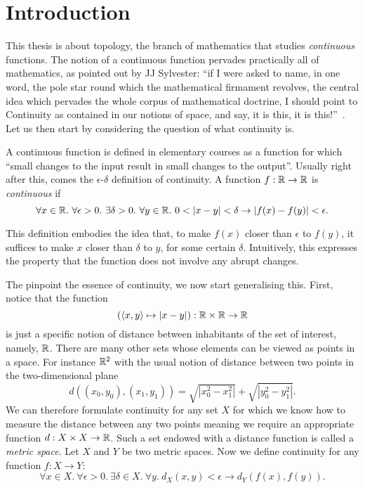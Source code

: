 \chapter{Introduction}

This thesis is about topology, the branch of mathematics that studies \emph{continuous}
functions. The notion of a continuous function pervades practically all of mathematics, as
pointed out by JJ Sylvester: ``if I were asked to name, in one word, the pole star round
which the mathematical firmament revolves, the central idea which pervades the whole
corpus of mathematical doctrine, I should point to Continuity as contained in our notions
of space, and say, it is this, it is this!''~\cite[pg. 27]{armstrong-topology}. Let us
then start by considering the question of what continuity is.

A continuous function is defined in elementary courses as a function for which ``small
changes to the input result in small changes to the output''. Usually right after this,
comes the $\epsilon$-$\delta$ definition of continuity. A function $f : \mathbb{R}{} \rightarrow \mathbb{R}{}$ is
\emph{continuous} if
\begin{equation*}\label{eq:cont-0}
  \forall x \in \mathbb{R}{}.~ \forall \epsilon > 0.~ \exists \delta > 0.~ \forall y \in \mathbb{R}{}.~
    0 < | x - y | < \delta \rightarrow | f(x) - f(y) | < \epsilon.
\end{equation*}

This definition embodies the idea that, to make $f(x)$ closer than $\epsilon$ to $f(y)$, it
suffices to make $x$ closer than $\delta$ to $y$, for some certain $\delta$. Intuitively, this
expresses the property that the function does not involve any abrupt changes.

The pinpoint the essence of continuity, we now start generalising this. First, notice that
the function
\begin{equation*}
  (\langle x, y \rangle \mapsto | x - y |) : \mathbb{R}{} \times \mathbb{R}{} \rightarrow \mathbb{R}{}
\end{equation*}
is just a specific notion of distance between inhabitants of the set of interest, namely,
$\mathbb{R}{}$. There are many other sets whose elements can be viewed as points in a space.
For instance $\mathbb{R}{}^2$ with the usual notion of distance between two points in the
two-dimensional plane
\begin{equation*}
  d((x_0, y_0) , (x_1 , y_1)) = \sqrt{| x_0^2 - x_1^2 |} + \sqrt{| y_0^2 - y_1^2 |}.
\end{equation*}
We can therefore formulate continuity for any set $X$ for which we know how to measure the
distance between any two points meaning we require an appropriate function $d : X \times
X \rightarrow \mathbb{R}{}$. Such a set endowed with a distance function is called a
\emph{metric space}. Let $X$ and $Y$ be two metric spaces. Now we define continuity for
any function $f : X \rightarrow Y$:
\begin{equation*}
  \forall x \in X.~ \forall \epsilon > 0.~ \exists \delta \in X.~ \forall y.~ d_X(x, y) < \epsilon \rightarrow d_Y(f(x), f(y)).
\end{equation*}

